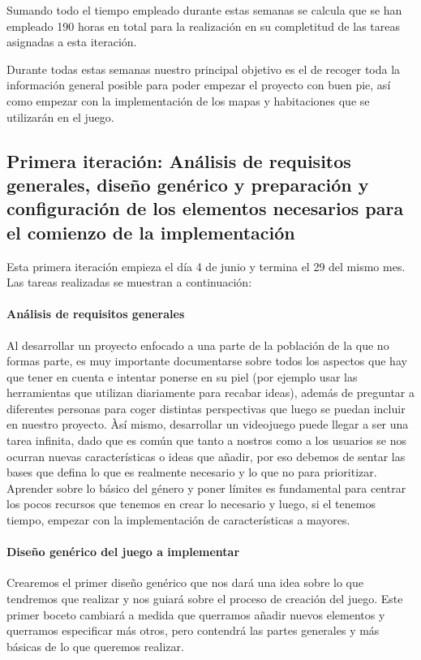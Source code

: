 Sumando todo el tiempo empleado durante estas semanas se calcula que se han empleado 190 horas en total para la realización en su completitud de las tareas asignadas a esta iteración.

Durante todas estas semanas nuestro principal objetivo es el de recoger toda la información general posible para poder empezar el proyecto con buen pie, así como empezar con la implementación de los mapas y habitaciones que se utilizarán en el juego.

\subsection{Primera iteración: Análisis de requisitos generales, diseño genérico y preparación y configuración de los elementos necesarios para el comienzo de la implementación}

Esta primera iteración empieza el día 4 de junio y termina el 29 del mismo mes. Las tareas realizadas se muestran a continuación:

\paragraph{Análisis de requisitos generales} Al desarrollar un proyecto enfocado a una parte de la población de la que no formas parte, es muy importante documentarse sobre todos los aspectos que hay que tener en cuenta e intentar ponerse en su piel (por ejemplo usar las herramientas que utilizan diariamente para recabar ideas), además de preguntar a diferentes personas para coger distintas perspectivas que luego se puedan incluir en nuestro proyecto.
Àsí mismo, desarrollar un videojuego puede llegar a ser una tarea infinita, dado que es común que tanto a nostros como a los usuarios se nos ocurran nuevas características o ideas que añadir, por eso debemos de sentar las bases que defina lo que es realmente necesario y lo que no para prioritizar. 
Aprender sobre lo básico del género y poner límites es fundamental para centrar los pocos recursos que tenemos en crear lo necesario y luego, si el tenemos tiempo, empezar con la implementación de características a mayores.

\paragraph{Diseño genérico del juego a implementar} Crearemos el primer diseño genérico que nos dará una idea sobre lo que tendremos que realizar y nos guiará sobre el proceso de creación del juego. Este primer boceto cambiará a medida que querramos añadir nuevos elementos y querramos especificar más otros, pero contendrá las partes generales y más básicas de lo que queremos realizar.

